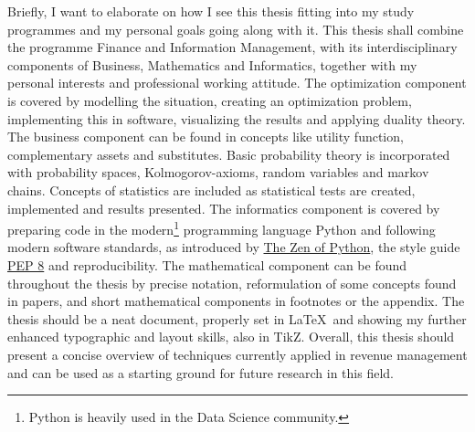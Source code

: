 Briefly, I want to elaborate on how I see this thesis fitting into my study programmes and my personal goals going along with it. This thesis shall combine the programme Finance and Information Management, with its interdisciplinary components of Business, Mathematics and Informatics, together with my personal interests and professional working attitude. The optimization component is covered by modelling the situation, creating an optimization problem, implementing this in software, visualizing the results and applying duality theory. The business component can be found in concepts like utility function, complementary assets and substitutes. Basic probability theory is incorporated with probability spaces, Kolmogorov-axioms, random variables and markov chains. Concepts of statistics are included as statistical tests are created, implemented and results presented. The informatics component is covered by preparing code in the modern\footnote{Python is heavily used in the Data Science community.} programming language Python and following modern software standards, as introduced by \href{https://www.python.org/dev/peps/pep-0020/}{The Zen of Python}, the style guide \href{https://www.python.org/dev/peps/pep-0008/}{PEP 8} and reproducibility. The mathematical component can be found throughout the thesis by precise notation, reformulation of some concepts found in papers, and short mathematical components in footnotes or the appendix. The thesis should be a neat document, properly set in \LaTeX~and showing my further enhanced typographic and layout skills, also in TikZ. Overall, this thesis should present a concise overview of techniques currently applied in revenue management and can be used as a starting ground for future research in this field.